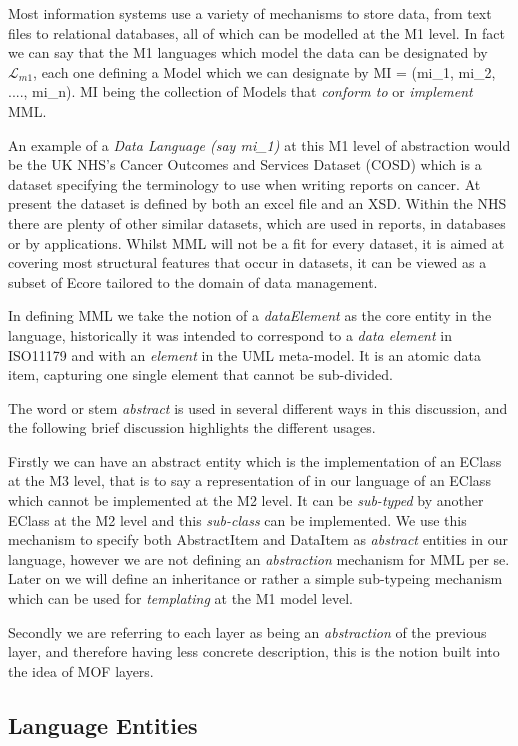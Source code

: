 \documentclass[a4paper,twoside]{article}
\newcommand{\Lagr}{\mathcal{L}}
\begin{document}
Most information systems use a variety of mechanisms to store data, from text files to relational databases, all of which can be modelled at the M1 level.  In fact we can say that the M1 languages which model the data can be designated by $\Lagr_{m1}$, each one defining a Model which we can designate by MI = (mi\_1, mi\_2, ...., mi\_n).  MI being the collection of Models that \emph{conform to} or \emph{implement} MML.  

An example of a \emph{Data Language (say mi\_1)} at this M1 level of abstraction would be the UK NHS's Cancer Outcomes and Services Dataset (COSD) which is a dataset specifying the terminology to use when writing reports on cancer. At present the dataset is defined by both an excel file and an XSD.  Within the NHS there are plenty of other similar datasets, which are used in reports, in databases or by applications.  Whilst MML will not be a fit for every dataset, it is aimed at covering most structural features that occur in datasets, it can be viewed as a subset of Ecore tailored to the domain of data management.

In defining MML we take the notion of a \emph{dataElement} as the core entity in the language, historically it was intended to correspond to a \emph{data element} in ISO11179 and with an \emph{element} in the UML meta-model. It is an atomic data item, capturing one single element that cannot be sub-divided.

The word or stem \emph{abstract} is used in several different ways in this discussion, and the following brief discussion highlights the different usages.  

Firstly we can have an abstract entity which is the implementation of an EClass at the M3 level, that is to say a representation of in our language of an EClass which cannot be implemented at the M2 level. It can be \emph{sub-typed} by another EClass at the M2 level and this \emph{sub-class} can be implemented. We use this mechanism to specify both AbstractItem and DataItem as \emph{abstract} entities in our language, however we are not defining an \emph{abstraction} mechanism for MML per se. Later on we will define an inheritance or rather a simple sub-typeing mechanism which can be used for \emph{templating} at the M1 model level. 

Secondly we are referring to each layer as being an \emph{abstraction} of the previous layer, and therefore having less concrete description, this is the notion built into the idea of MOF layers. 

\subsection{Language Entities}
\end{document}
